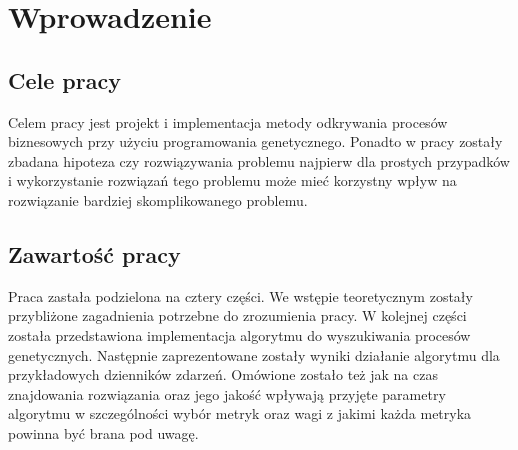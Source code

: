 \chapter{Wprowadzenie}
\label{cha:wprowadzenie}


\section{Cele pracy}
\label{sec:celePracy}

Celem pracy jest projekt i implementacja metody odkrywania procesów biznesowych przy użyciu programowania genetycznego. Ponadto w pracy zostały zbadana hipoteza czy rozwiązywania problemu najpierw dla prostych przypadków i wykorzystanie rozwiązań tego problemu może mieć korzystny wpływ na rozwiązanie bardziej skomplikowanego problemu.

\section{Zawartość pracy}
\label{sec:zawartoscPracy}

Praca zastała podzielona na cztery części. We wstępie teoretycznym zostały przybliżone zagadnienia potrzebne do zrozumienia pracy. W kolejnej części została przedstawiona implementacja algorytmu do wyszukiwania procesów genetycznych. Następnie zaprezentowane zostały wyniki działanie algorytmu dla przykładowych dzienników zdarzeń. Omówione zostało też jak na czas znajdowania rozwiązania oraz jego jakość wpływają przyjęte parametry algorytmu w szczególności wybór metryk oraz wagi z jakimi każda metryka powinna być brana pod uwagę.  


















